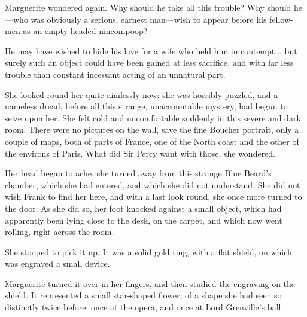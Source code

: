 Marguerite wondered again. Why should he take all this trouble? Why should he\allowbreak---\allowbreak who was obviously a serious, earnest man\allowbreak---\allowbreak wish to appear before his fellow-men as an empty-headed nincompoop?

He may have wished to hide his love for a wife who held him in contempt... but surely such an object could have been gained at less sacrifice, and with far less trouble than constant incessant acting of an unnatural part.

She looked round her quite aimlessly now: she was horribly puzzled, and a nameless dread, before all this strange, unaccountable mystery, had begun to seize upon her. She felt cold and uncomfortable suddenly in this severe and dark room. There were no pictures on the wall, save the fine Boucher portrait, only a couple of maps, both of parts of France, one of the North coast and the other of the environs of Paris. What did Sir Percy want with those, she wondered.

Her head began to ache, she turned away from this strange Blue Beard's chamber, which she had entered, and which she did not understand. She did not wish Frank to find her here, and with a last look round, she once more turned to the door. As she did so, her foot knocked against a small object, which had apparently been lying close to the desk, on the carpet, and which now went rolling, right across the room.

She stooped to pick it up. It was a solid gold ring, with a flat shield, on which was engraved a small device.

Marguerite turned it over in her fingers, and then studied the engraving on the shield. It represented a small star-shaped flower, of a shape she had seen so distinctly twice before: once at the opera, and once at Lord Grenville's ball.